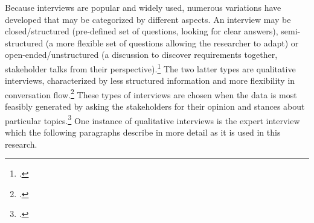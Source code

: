 Because interviews are popular and widely used, numerous variations have developed that may be categorized by different aspects. An interview may be closed/structured (pre-defined set of questions, looking for clear answers), semi-structured (a more flexible set of questions allowing the researcher to adapt) or open-ended/unstructured (a discussion to discover requirements together, stakeholder talks from their perspective).\footcites[Cf.][p.2]{TiwariMethodologySelectionRequirement2017}[cf.][p.39 et seqq]{EdwardsWhatqualitativeinterviewing2013} The two latter types are qualitative interviews, characterized by less structured information and more flexibility in conversation flow.\footcite[Cf.][p.13]{EdwardsWhatqualitativeinterviewing2013} These types of interviews are chosen when the data is most feasibly generated by asking the stakeholders for their opinion and stances about particular topics.\footcite[Cf.][p.76]{MasonQualitativeresearching2002} One instance of qualitative interviews is the expert interview which the following paragraphs describe in more detail as it is used in this research.




